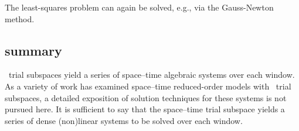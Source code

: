 The least-squares problem can again be solved, e.g., via the Gauss-Newton method. 

\subsection{\spaceTimeAcronym\: summary}
\spaceTimeAcronym\ trial subspaces yield a series of space--time algebraic systems over each window. As a variety of work has examined space--time reduced-order models with \spaceTimeAcronym\ trial subspaces, 
a detailed exposition of solution techniques for these systems is not pursued here. It is sufficient to say that the 
space--time trial subspace yields a series of dense (non)linear systems to be solved over each window.
